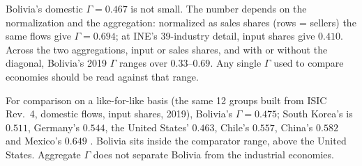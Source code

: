 \documentclass[../structural_economics_book.tex]{subfiles}
\begin{document}
\begin{example}
Bolivia's domestic $\Gamma = 0.467$ is not small. The number depends on the normalization and the aggregation: normalized as sales shares (rows = sellers) the same flows give $\Gamma = 0.694$; at INE's 39-industry detail, input shares give $0.410$. Across the two aggregations, input or sales shares, and with or without the diagonal, Bolivia's 2019 $\Gamma$ ranges over $0.33$--$0.69$. Any single $\Gamma$ used to compare economies should be read against that range.

For comparison on a like-for-like basis (the same 12 groups built from ISIC Rev.~4, domestic flows, input shares, 2019), Bolivia's $\Gamma = 0.475$; South Korea's is $0.511$, Germany's $0.544$, the United States' $0.463$, Chile's $0.557$, China's $0.582$ and Mexico's $0.649$ \citep{oecd2023icio}. Bolivia sits inside the comparator range, above the United States. Aggregate $\Gamma$ does not separate Bolivia from the industrial economies.
\end{example}
\end{document}
